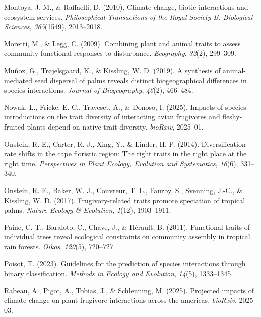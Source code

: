 \documentclass[
]{agujournal2019}
\newlength{\cslhangindent}
\newenvironment{CSLReferences}[2] %
 {\begin{list}{}{%
  \setlength{\itemindent}{0pt}
  \setlength{\leftmargin}{0pt}
  \setlength{\parsep}{0pt}
  \ifodd #1
   \setlength{\leftmargin}{\cslhangindent}
   \setlength{\itemindent}{-1\cslhangindent}
  \fi
  \setlength{\itemsep}{#2\baselineskip}}}
 {\end{list}}
\begin{document}
\begin{CSLReferences}{1}{0}
Montoya, J. M., \& Raffaelli, D. (2010). Climate change, biotic
interactions and ecosystem services. \emph{Philosophical Transactions of
the Royal Society B: Biological Sciences}, \emph{365}(1549), 2013--2018.

Moretti, M., \& Legg, C. (2009). Combining plant and animal traits to
assess community functional responses to disturbance. \emph{Ecography},
\emph{32}(2), 299--309.

Muñoz, G., Trøjelsgaard, K., \& Kissling, W. D. (2019). A synthesis of
animal-mediated seed dispersal of palms reveals distinct biogeographical
differences in species interactions. \emph{Journal of Biogeography},
\emph{46}(2), 466--484.

Nowak, L., Fricke, E. C., Traveset, A., \& Donoso, I. (2025). Impacts of
species introductions on the trait diversity of interacting avian
frugivores and fleshy-fruited plants depend on native trait diversity.
\emph{bioRxiv}, 2025--01.

Onstein, R. E., Carter, R. J., Xing, Y., \& Linder, H. P. (2014).
Diversification rate shifts in the cape floristic region: The right
traits in the right place at the right time. \emph{Perspectives in Plant
Ecology, Evolution and Systematics}, \emph{16}(6), 331--340.

Onstein, R. E., Baker, W. J., Couvreur, T. L., Faurby, S., Svenning,
J.-C., \& Kissling, W. D. (2017). Frugivory-related traits promote
speciation of tropical palms. \emph{Nature Ecology \& Evolution},
\emph{1}(12), 1903--1911.

Paine, C. T., Baraloto, C., Chave, J., \& Hérault, B. (2011). Functional
traits of individual trees reveal ecological constraints on community
assembly in tropical rain forests. \emph{Oikos}, \emph{120}(5),
720--727.

Poisot, T. (2023). Guidelines for the prediction of species interactions
through binary classification. \emph{Methods in Ecology and Evolution},
\emph{14}(5), 1333--1345.

Rabeau, A., Pigot, A., Tobias, J., \& Schleuning, M. (2025). Projected
impacts of climate change on plant-frugivore interactions across the
americas. \emph{bioRxiv}, 2025--03.


\end{CSLReferences}
\end{document}

